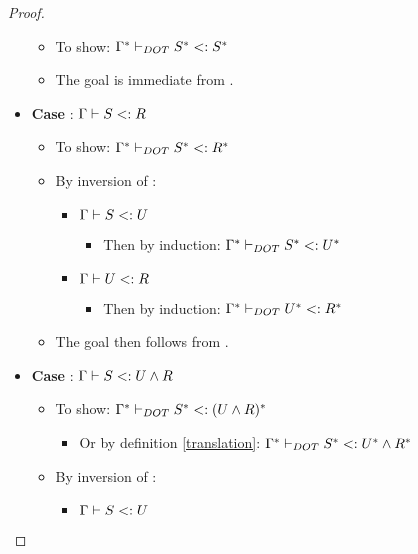 \begin{proof}
\begin{itemize}
\begin{itemize}
            \item To show: $\Gamma^{*} \vdash_{DOT} S^{*} <: S^{*}$
            \item The goal is immediate from .
        \end{itemize}
        \item \textbf{Case} : $\Gamma \vdash S <: R$
        \begin{itemize}
            \item To show: $\Gamma^{*} \vdash_{DOT} S^{*} <: R^{*}$
            \item By inversion of :
            \begin{itemize}
                \item $\Gamma \vdash S <: U$
                \begin{itemize}
                    \item Then by induction:
                        $\Gamma^{*} \vdash_{DOT} S^{*} <: U^{*}$
                \end{itemize}
                \item $\Gamma \vdash U <: R$
                \begin{itemize}
                    \item Then by induction:
                        $\Gamma^{*} \vdash_{DOT} U^{*} <: R^{*}$
                \end{itemize}
            \end{itemize}
            \item The goal then follows from .
        \end{itemize}
        \item \textbf{Case} : $\Gamma \vdash S <: U \wedge R$
        \begin{itemize}
            \item To show:
                $\Gamma^{*} \vdash_{DOT} S^{*} <: (U \wedge R)^{*}$
            \begin{itemize}
                \item Or by definition \ref{translation}: $\Gamma^{*} \vdash_{DOT} S^{*} <: U^{*} \wedge R^{*}$
            \end{itemize}
            \item By inversion of :
            \begin{itemize}
                \item $\Gamma \vdash S <: U$
                \begin{itemize}

\end{itemize}
\end{itemize}
\end{itemize}
\end{itemize}
\end{proof}
